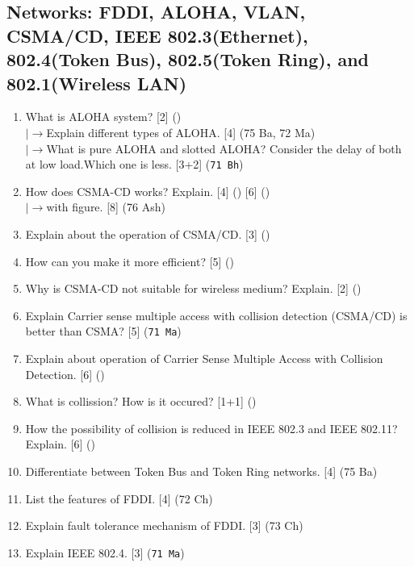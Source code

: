 \documentclass[12pt]{article}
\newcommand{\lb}{\\$\left|\rightarrow\right.$}
\begin{document}
	\subsection{Networks: FDDI, ALOHA, VLAN, CSMA/CD, IEEE 802.3(Ethernet), 802.4(Token Bus), 802.5(Token Ring), and 802.1(Wireless LAN)}
		\begin{enumerate}[noitemsep, topsep=0pt]
			\item What is ALOHA system? \hfill [2] ()
			\lb Explain different types of ALOHA. \hfill [4] (75 Ba, 72 Ma)
			\lb What is pure ALOHA and slotted ALOHA? Consider the delay of both at low load.Which one is less. \hfill [3+2] (\texttt{71 Bh})


			\item How does CSMA-CD works? Explain. \hfill [4] () [6] ()
			\lb with figure. \hfill [8] (76 Ash)

			\item Explain about the operation of CSMA/CD. \hfill [3] ()

			\item How can you make it more efficient? \hfill [5] ()

			\item Why is CSMA-CD not suitable for wireless medium? Explain. \hfill [2] ()
			
			\item Explain Carrier sense multiple access with collision detection (CSMA/CD) is better than CSMA? \hfill[5] (\texttt{71 Ma})

			\item Explain about operation of Carrier Sense Multiple Access with Collision Detection. \hfill [6] ()
			
			\item What is collission? How is it occured? \hfill [1+1] ()

			\item How the possibility of collision is reduced in IEEE 802.3 and IEEE 802.11? Explain. \hfill [6] ()

			\item Differentiate between Token Bus and Token Ring networks. \hfill [4] (75 Ba)

			\item List the features of FDDI. \hfill [4] (72 Ch)

			\item Explain fault tolerance mechanism of FDDI. \hfill [3] (73 Ch) 

			\item Explain IEEE 802.4. \hfill [3] (\texttt{71 Ma})
		\end{enumerate}
			
\end{document}
